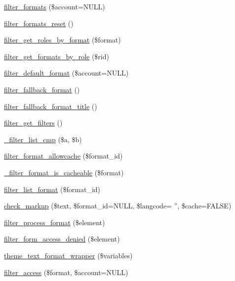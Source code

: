 \begin{DoxyCompactItemize}
\item 
\hyperlink{filter_8module_a9768cd98262e5de87ebcc1b2bb507b7b}{filter\_\-formats} (\$account=NULL)
\item 
\hyperlink{filter_8module_a01762171df5ab9dcbbcd6eb47013f681}{filter\_\-formats\_\-reset} ()
\item 
\hyperlink{filter_8module_a53d0e4b419852da83e67f815912603b2}{filter\_\-get\_\-roles\_\-by\_\-format} (\$format)
\item 
\hyperlink{filter_8module_a3df4b9ad5e508bd13115b77401c56285}{filter\_\-get\_\-formats\_\-by\_\-role} (\$rid)
\item 
\hyperlink{filter_8module_a187d29b1feb447737d57276e06655312}{filter\_\-default\_\-format} (\$account=NULL)
\item 
\hyperlink{filter_8module_a8e7d56dc990c1c1e54b296ddb74bcdcd}{filter\_\-fallback\_\-format} ()
\item 
\hyperlink{filter_8module_ad9e4a95f0ee5da1fb64a2c700355c864}{filter\_\-fallback\_\-format\_\-title} ()
\item 
\hyperlink{filter_8module_a9a4d34bbacb92f82ae844fefbd20d32d}{filter\_\-get\_\-filters} ()
\item 
\hyperlink{filter_8module_afa289405136953ef594285021955f7e7}{\_\-filter\_\-list\_\-cmp} (\$a, \$b)
\item 
\hyperlink{filter_8module_a3bbed48afc05f0a85c9f8a5e3bfd785f}{filter\_\-format\_\-allowcache} (\$format\_\-id)
\item 
\hyperlink{filter_8module_aab4f5d65547268e4dd302b7bcc6b7c83}{\_\-filter\_\-format\_\-is\_\-cacheable} (\$format)
\item 
\hyperlink{filter_8module_a29a31789549de093dd96e9d4f58b41a8}{filter\_\-list\_\-format} (\$format\_\-id)
\item 
\hyperlink{group__sanitization_gaa3872d938cf9ba93ed0621a6b26eaa59}{check\_\-markup} (\$text, \$format\_\-id=NULL, \$langcode= '', \$cache=FALSE)
\item 
\hyperlink{filter_8module_a7d09545c482bcb763bd50529bc00644b}{filter\_\-process\_\-format} (\$element)
\item 
\hyperlink{filter_8module_ab57887ced69322fceb2f9e70b6e92650}{filter\_\-form\_\-access\_\-denied} (\$element)
\item 
\hyperlink{group__themeable_gadfd0e06f1e78fbc4f260b84872e1911e}{theme\_\-text\_\-format\_\-wrapper} (\$variables)
\item 
\hyperlink{filter_8module_aff74c90622b601df8e088f6b5c125bb7}{filter\_\-access} (\$format, \$account=NULL)

\end{DoxyCompactItemize}
